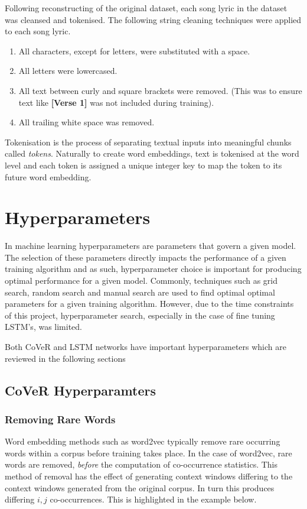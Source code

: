 \noindent
\newline
Following reconstructing of the original dataset, each song lyric in the dataset was cleansed and tokenised. The following string cleaning techniques were applied to each song lyric.

\begin{enumerate}
	\item All characters, except for letters, were substituted with a space.
	\item All letters were lowercased.
	\item All text between curly and square brackets were removed. (This was to ensure text like \textbf{[Verse 1]} was not included during training).
	\item All trailing white space was removed.
\end{enumerate}

\noindent
\newline
Tokenisation is the process of separating textual inputs into meaningful chunks called \textit{tokens}. Naturally to create word embeddings, text is tokenised at the word level and each token is assigned a unique integer key to map the token to its future word embedding.

\section{Hyperparameters}
In machine learning hyperparameters are parameters that govern a given model. The selection of these parameters directly impacts the performance of a given training algorithm and as such, hyperparameter choice is important for producing optimal performance for a given model. Commonly, techniques such as grid search, random search and manual search are used to find optimal optimal parameters for a given training algorithm. However, due to the time constraints of this project, hyperparameter search, especially in the case of fine tuning LSTM's, was limited.

\noindent
\newline
Both CoVeR and LSTM networks have important hyperparameters which are reviewed in the following sections
\subsection{CoVeR Hyperparamters}
\subsubsection{Removing Rare Words}
Word embedding methods such as word2vec typically remove rare occurring words within a corpus before training takes place. In the case of word2vec, rare words are removed, \textit{before} the computation of co-occurrence statistics. This method of removal has the effect of generating  context windows differing to the context windows generated from the original corpus. In turn this produces differing \(i,j\) co-occurrences. This is highlighted in the example below.

